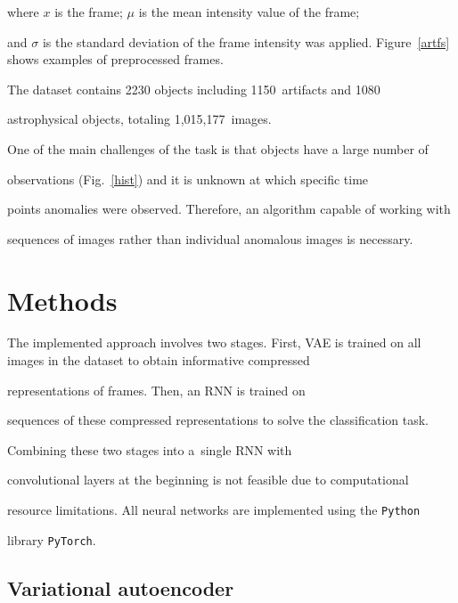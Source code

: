             

            \noindent

where $x$ is the frame; $\mu$ is the mean intensity value of the frame; 

and $\sigma$ is the standard deviation of the frame intensity  was applied. Figure~\ref{artfs} shows examples of preprocessed frames.



The dataset contains 2230 objects including 1150~artifacts and 1080 

astrophysical objects, totaling 1,015,177~images.





One of the main challenges of the task is that objects have a large number of 

observations (Fig.~\ref{hist}) and it is unknown at which specific time 

points anomalies were observed. Therefore, an algorithm capable of working with 

sequences of images rather than individual anomalous images is necessary.





\section{Methods}



\noindent

The implemented approach involves two stages. First, VAE is trained on all images in the dataset to obtain informative compressed 

representations of frames. Then, an RNN is trained on 

sequences of these compressed representations to solve the classification task. 

Combining these two stages into a~single RNN with 

convolutional layers at the beginning is not feasible due to computational 

resource limitations. All neural networks are implemented using the {\tt Python} 

library {\tt PyTorch}.



\subsection{Variational autoencoder}



